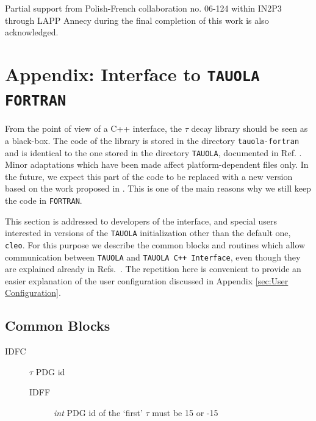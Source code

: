 \documentclass[]{Tauola_interface_design}
\begin{document}
Partial support from Polish-French collaboration
no. 06-124 within IN2P3 through LAPP Annecy during the final completion of this work is
also acknowledged.




{}
%


\newpage
\appendix

\section{Appendix: Interface to {\tt TAUOLA FORTRAN}}
\label{Interface to TAUOLA}

From the point of view of a C++ interface, the $\tau$ decay library should be 
seen as a black-box. The code of the library is stored in the  directory  {\tt tauola-fortran} and 
is 
identical to the one stored in the directory {\tt TAUOLA}, documented in Ref. \cite{Golonka:2003xt}. 
Minor adaptations which have been made affect 
 platform-dependent files only. In the future, we expect this part 
of the code to be replaced
with a new version based on the work proposed in \cite{Actis:2010gg}. 
This is one of the main reasons why we still keep the 
code  in  {\tt FORTRAN}.

This section is addressed to developers of the interface, 
and special users interested in versions of the {\tt TAUOLA} initialization
other than the default one, {\tt cleo}. For this purpose
we describe the common blocks and routines which allow
communication between {\tt TAUOLA} and {\tt TAUOLA C++  Interface}, even though
they are explained already in
Refs.~\cite{Jadach:1990mz,Jezabek:1991qp,Jadach:1993hs,Golonka:2003xt}.
The repetition here is convenient to provide an easier explanation of the user configuration discussed in Appendix
\ref{sec:User Configuration}.


\subsection{Common Blocks}

\begin{description}
\item[IDFC] $\tau$ PDG id
    \begin{description}
    \item[IDFF] \textit{int}  PDG id of the `first' $\tau$ must be 15 or -15
    \end{description}
\end{description}
\end{document}
